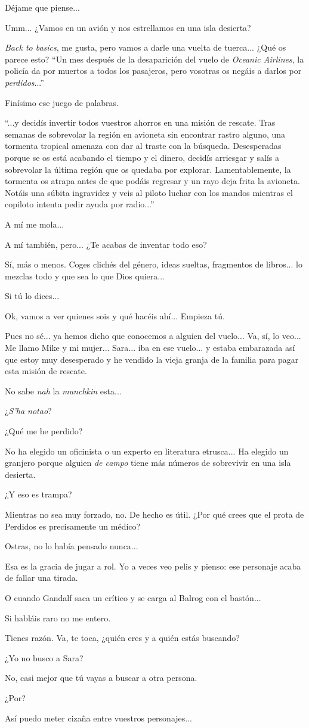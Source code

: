 \documentclass[10pt, a5paper, twocolumn]{article}
\newenvironment{dialogue}
    {\begin{description}[leftmargin=!,align=right,labelwidth=0.cm]}
    {\end{description}}
\newcommand\A{\item[\raisebox{-0.25em}{\scalebox{0.75}{\bctetraedre}}]}
\newcommand\B{\item[\raisebox{-0.25em}{\scalebox{0.75}{\bccube}}]}
\newcommand\E{\item[\raisebox{-0.25em}{\scalebox{0.75}{\bcicosaedre}}]}
\begin{document}
\begin{dialogue}
        \B Déjame que piense...
        \A Umm... ¿Vamos en un avión y nos estrellamos en una isla desierta?
        \E \emph{Back to basics}, me gusta, pero vamos a darle una vuelta de tuerca... ¿Qué os parece esto? ``Un mes después de la desaparición del vuelo de \emph{Oceanic Airlines}, la policía da por muertos a todos los pasajeros, pero vosotras os negáis a darlos por \emph{perdidos}...''
        \B Finísimo ese juego de palabras.
        \E ``...y decidís invertir todos vuestros ahorros en una misión de rescate. Tras semanas de sobrevolar la región en avioneta sin encontrar rastro alguno, una tormenta tropical amenaza con dar al traste con la búsqueda. Desesperadas porque se os está acabando el tiempo y el dinero, decidís arriesgar y salís a sobrevolar la última región que os quedaba por explorar. Lamentablemente, la tormenta os atrapa antes de que podáis regresar y un rayo deja frita la avioneta. Notáis una súbita ingravidez y veis al piloto luchar con los mandos mientras el copiloto intenta pedir ayuda por radio...''
        \B A mí me mola...
        \A A mí también, pero... ¿Te acabas de inventar todo eso?
        \E Sí, más o menos. Coges clichés del género, ideas sueltas, fragmentos de libros... lo mezclas todo y que sea lo que Dios quiera...
        \A Si tú lo dices...
        \E Ok, vamos a ver quienes sois y qué hacéis ahí... Empieza tú.
        \B Pues no sé... ya hemos dicho que conocemos a alguien del vuelo... Va, sí, lo veo... Me llamo Mike y mi mujer... Sara... iba en ese vuelo... y estaba embarazada así que estoy muy desesperado y he vendido la vieja granja de la familia para pagar esta misión de rescate.
        \E No sabe \emph{nah} la \emph{munchkin} esta...
        \B ¿\emph{S'ha notao}?
        \A ¿Qué me he perdido?
        \E No ha elegido un oficinista o un experto en literatura etrusca... Ha elegido un granjero porque alguien \emph{de campo} tiene más números de sobrevivir en una isla desierta.
        \A ¿Y eso es trampa?
        \E Mientras no sea muy forzado, no. De hecho es útil. ¿Por qué crees que el prota de Perdidos es precisamente un médico?
        \A Ostras, no lo había pensado nunca...
        \B Esa es la gracia de jugar a rol. Yo a veces veo pelis y pienso: ese personaje acaba de fallar una tirada.
        \E O cuando Gandalf saca un crítico y se carga al Balrog con el bastón...
        \A Si habláis raro no me entero.
        \E Tienes razón. Va, te toca, ¿quién eres y a quién estás buscando?
        \A ¿Yo no busco a Sara?
        \E No, casi mejor que tú vayas a buscar a otra persona.
        \A ¿Por?
        \E Así puedo meter cizaña entre vuestros personajes...

\end{dialogue}
\end{document}
